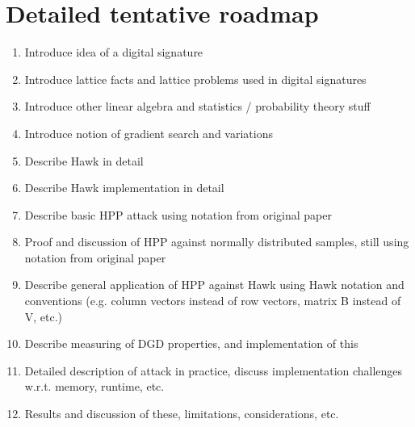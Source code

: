 \section{Detailed tentative roadmap}
\begin{enumerate}
    \item Introduce idea of a digital signature
    \item Introduce lattice facts and lattice problems used in digital signatures
    \item Introduce other linear algebra and statistics / probability theory stuff
    \item Introduce notion of gradient search and variations
    \item Describe Hawk in detail
    \item Describe Hawk implementation in detail
    \item Describe basic HPP attack using notation from original paper
    \item Proof and discussion of HPP against normally distributed samples, still using notation from original paper
    \item Describe general application of HPP against Hawk using Hawk notation and conventions (e.g. column vectors instead of row vectors,
        matrix B instead of V, etc.)
    \item Describe measuring of DGD properties, and implementation of this
    \item Detailed description of attack in practice, discuss implementation challenges w.r.t. memory, runtime, etc.
    \item Results and discussion of these, limitations, considerations, etc.
\end{enumerate}

